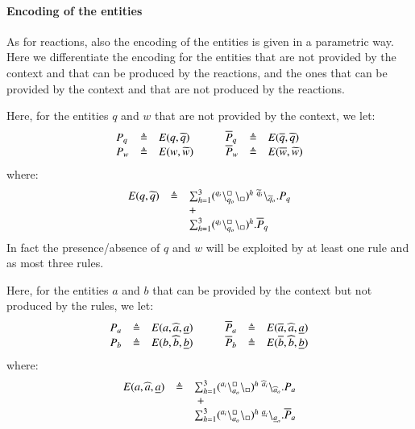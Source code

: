 \paragraph{Encoding of the entities}
As for reactions, also the encoding of the entities is given in a parametric way.
Here we differentiate the encoding for the entities that are not provided by the context and that can be produced by the reactions, and the ones that can be provided by the context and that are not produced by the reactions.

Here, for the entities $q$ and $w$ that are not provided by the context, we let:
\[
\begin{array}{lcl@{\hspace{1cm}}lcl}
P_q & \defeq & E(q,\widetilde{q}) & \overline{P}_q & \defeq & E(\overline{q},\widetilde{q}) \\
P_w& \defeq & E(w,\widetilde{w}) & \overline{P}_w & \defeq & E(\overline{w},\widetilde{w})
\end{array}
\]
where:
\[
\begin{array}{lcl}
E(q,\widetilde{q})&\defeq & \sum_{h=1}^3 (\startchain{q_i}\chainedlink{q_o}{\noact}\chainend{\noact})^h\ \link{\widetilde{q}_i}{\widetilde{q}_o}.P_q\\
&& +\\
&& \sum_{h=1}^3 (\startchain{q_i}\chainedlink{q_o}{\noact}\chainend{\noact})^h.\overline{P}_q\\
\end{array}
\]
In fact the presence/absence of $q$ and $w$ will be exploited by at least one rule and as most three rules.


Here, for the entities $a$ and $b$ that can be provided by the context but not produced by the rules, we let:
\[
\begin{array}{lcl@{\hspace{1cm}}lcl}
P_a & \defeq & E(a,\widehat{a},\underline{a}) & 
\overline{P}_a & \defeq & E(\overline{a},\widehat{a},\underline{a}) \\
P_b& \defeq & E(b,\widehat{b},\underline{b})&
\overline{P}_b& \defeq & E(\overline{b},\widehat{b},\underline{b})
\end{array}
\]
where:
\[
\begin{array}{rcl}
 E(a,\widehat{a},\underline{a}) & \defeq &\sum_{h=1}^3  
  (\startchain{a_i}\chainedlink{a_o}{\noact}\chainend{\noact})^h \ \startchain{\widehat{a}_i}\chainend{\widehat{a}_o}.P_a\\
&&\ + \\
&&
\sum_{h=1}^3
 (\startchain{a_i}\chainedlink{a_o}{\noact}\chainend{\noact})^h \ \startchain{\underline{a}_i}\chainend{\underline{a}_o}.\overline{P}_a
\end{array}
\]


